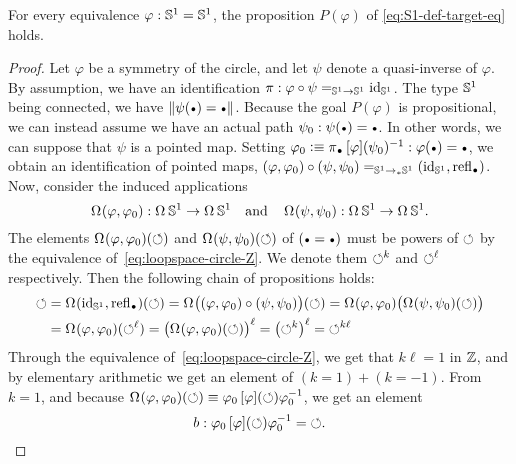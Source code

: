 \documentclass[english,a4paper]{lmcs}
\begin{document}
\begin{prop}
  \label{prop:S1-eq-either}%
  For every equivalence $\varphi:{{\mathbb S^{1}}}={{\mathbb S^{1}}}$, the proposition
  $P(\varphi)$ of \cref{eq:S1-def-target-eq} holds.
\end{prop}
\begin{proof}
  Let $\varphi$ be a symmetry of the circle, and let $\psi$ denote a
  quasi-inverse of $\varphi$.
  By assumption, we have an identification $\pi : \varphi\circ\psi =_{{{\mathbb S^{1}}}\to{{\mathbb S^{1}}}} \mathord{\mathrm{id}}_{{\mathbb S^{1}}}$.
  The type ${{\mathbb S^{1}}}$ being connected, we have
  $\Trunc{\psi(\base) = \base}$. Because the goal $P(\varphi)$ is
  propositional, we can instead assume we have an actual path
  $\psi_0\from \psi(\base) = \base$.
  In other words, we can suppose that $\psi$ is a pointed map.
  Setting $\varphi_0 \defequi \pi_{\base} \inv{\ap \varphi(\psi_0)} : \varphi(\base) = \base$,
  we obtain an identification of pointed maps,
  $(\varphi,\varphi_0) \circ (\psi,\psi_0) =_{\Sc\ptdto\Sc} (\id_\Sc, \refl\base)$.
  Now, consider the induced applications
  \begin{displaymath}
    \mathop{\Omega^{}} (\varphi,\varphi_0) : \mathop{\Omega^{}} {{\mathbb S^{1}}} \to \mathop{\Omega^{}} {{\mathbb S^{1}}}
    \quad\text{and}\quad
    \mathop{\Omega^{}} (\psi,\psi_0) : \mathop{\Omega^{}} {{\mathbb S^{1}}} \to \mathop{\Omega^{}} {{\mathbb S^{1}}}.
  \end{displaymath}
  The elements $\mathop{\Omega^{}} (\varphi,\varphi_0) (\mathord{\circlearrowleft})$ and
  $\mathop{\Omega^{}} (\psi,\psi_0) (\mathord{\circlearrowleft})$ of $(\base=\base)$ must be
  powers of $\mathord{\circlearrowleft}$ by the equivalence
  of~\cref{eq:loopspace-circle-Z}. We denote them $\mathord{\circlearrowleft}^k$ and
  $\mathord{\circlearrowleft}^\ell$ respectively. Then the following chain of propositions
  holds:
  \begin{align*}
    \Sloop
    &= \loopspace\null(\id_\Sc, \refl\base) (\Sloop)
    = \loopspace\null\bigl((\varphi,\varphi_0) \circ (\psi,\psi_0)\bigr) (\Sloop)
    = \loopspace\null(\varphi,\varphi_0)\bigl( \loopspace\null (\psi,\psi_0)(\Sloop) \bigr) \\
    &= \loopspace\null(\varphi,\varphi_0)(\Sloop^\ell)
    = \bigl(\loopspace\null(\varphi,\varphi_0)(\Sloop)\bigr)^\ell
    = \bigl(\Sloop^k\bigr)^\ell
    = \Sloop^{k\ell}
  \end{align*}
  Through the equivalence
  of~\cref{eq:loopspace-circle-Z}, we get that $k\ell=1$ in $\mathbb{Z}$,
  and by elementary arithmetic we get an element of $(k=1)+(k=-1)$.
  From $k=1$, and because
  $\mathop{\Omega^{}} (\varphi,\varphi_0)(\mathord{\circlearrowleft}) \equiv \varphi_0
  \mathop{\left[{\varphi}\right]}(\mathord{\circlearrowleft}) \varphi_0^{-1}$, we get an element
  \begin{displaymath}
    b\from \varphi_0 \ap\varphi(\Sloop) \inv {\varphi_0} = \Sloop.

\end{displaymath}
\end{proof}
\end{document}
